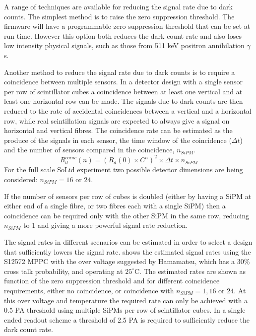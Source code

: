 \documentclass[a4paper]{article}
\begin{document}
A range of techniques are available for reducing the signal rate due to dark counts.
The simplest method is to raise the zero suppression threshold.
The firmware will have a programmable zero suppression threshold that can be set at run time.
However this option both reduces the dark count rate and also loses low intensity physical signals, such as those from 511 keV positron annihilation $\gamma$s.

Another method to reduce the signal rate due to dark counts is to require a coincidence between multiple sensors.
In a detector design with a single sensor per row of scintillator cubes a coincidence between at least one vertical and at least one horizontal row can be made.
The signals due to dark counts are then reduced to the rate of accidental coincidences between a vertical and a horizontal row, while real scintillation signals are expected to always give a signal on horizontal and vertical fibres.
The coincidence rate can be estimated as the produce of the signals in each sensor, the time window of the coincidence ($\Delta t$) and the number of sensors compared in the coincidence, $n_{SiPM}$.
\begin{equation}
    R_d^{coinc}(n) = (R_d(0)\times C^n)^2\times\Delta t\times n_{SiPM}
\end{equation}
For the full scale SoLid experiment two possible detector dimensions are being considered: $n_{SiPM} = 16$ or $24$.

If the number of sensors per row of cubes is doubled (either by having a SiPM at either end of a single fibre, or two fibres each with a single SiPM) then a coincidence can be required only with the other SiPM in the same row, reducing $n_{SiPM}$ to 1 and giving a more powerful signal rate reduction.

The signal rates in different scenarios can be estimated in order to select a design that sufficiently lowers the signal rate.
 shows the estimated signal rates using the S12572 MPPC with the over voltage suggested by Hamamatsu, which has a 30\% cross talk probability, and operating at $25^{\circ}$C.
The estimated rates are shown as function of the zero suppression threshold and for different coincidence requirements, either no coincidence, or coincidence with $n_{SiPM} = 1, 16\mbox{ or }24.$
At this over voltage and temperature the required rate can only be achieved with a 0.5 PA threshold using multiple SiPMs per row of scintillator cubes.
In a single ended readout scheme a threshold of 2.5 PA is required to sufficiently reduce the dark count rate.
\end{document}
